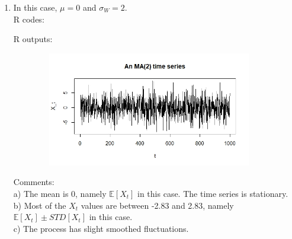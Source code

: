 \documentclass[10pt]{article}
\begin{document}
\begin{enumerate}[1)]
\item
In this case, $\mu=0$ and $\sigma_W=2$.\\
R codes:

R outputs:
\begin{figure}[H]
  \centering
  \includegraphics[width=10cm,height=5cm]{p23a.jpeg}
\end{figure}
Comments:\\
a) The mean is 0, namely $\mathbb{E}[X_t]$ in this case. The time series is stationary.\\
b) Most of the $X_t$ values are between -2.83 and 2.83, namely $\mathbb{E}[X_t]\pm{STD[X_t]}$ in this case.\\
c) The process has slight smoothed fluctuations.
\vspace{3mm}


\end{enumerate}
\end{document}
